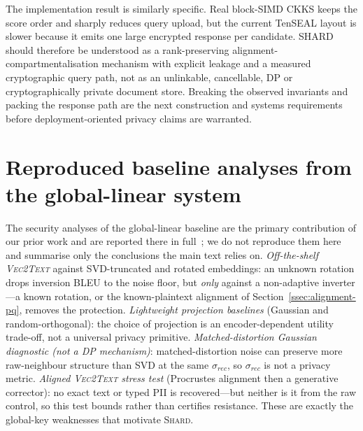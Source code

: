 The implementation result is similarly specific. Real block-SIMD CKKS keeps
the score order and sharply reduces query upload, but the current TenSEAL
layout is slower because it emits one large encrypted response per candidate.
SHARD should therefore be understood as a rank-preserving
alignment-compartmentalisation mechanism with explicit leakage and a measured
cryptographic query path, not as an unlinkable, cancellable, DP or
cryptographically private document store. Breaking the observed invariants
and packing the response path are the next construction and systems
requirements before deployment-oriented privacy claims are warranted.

\appendix
\section{Reproduced baseline analyses from the global-linear system}\label{app:baseline}\label{ssec:vec2text}\label{app:projbaselines}\label{app:noise}\label{ssec:adaptive-inversion}

The security analyses of the global-linear baseline are the primary
contribution of our prior work and are reported there in
full~\cite{ref_vkit,ref_alpha}; we do not reproduce them here and summarise
only the conclusions the main text relies on. \emph{Off-the-shelf
\textsc{Vec2Text}} against SVD-truncated and rotated embeddings: an unknown
rotation drops inversion BLEU to the noise floor, but \emph{only} against a
non-adaptive inverter---a known rotation, or the known-plaintext alignment
of Section~\ref{ssec:alignment-pq}, removes the protection.
\emph{Lightweight projection baselines} (Gaussian and random-orthogonal):
the choice of projection is an encoder-dependent utility trade-off, not a
universal privacy primitive. \emph{Matched-distortion Gaussian diagnostic
(not a DP mechanism)}:
matched-distortion noise can preserve more raw-neighbour structure than SVD
at the same $\sigma_{rec}$, so $\sigma_{rec}$ is not a privacy metric.
\emph{Aligned \textsc{Vec2Text} stress test} (Procrustes alignment then a
generative corrector): no exact text or typed PII is recovered---but neither
is it from the raw control, so this test bounds rather than certifies
resistance. These are exactly the global-key weaknesses that motivate
\textsc{Shard}.
